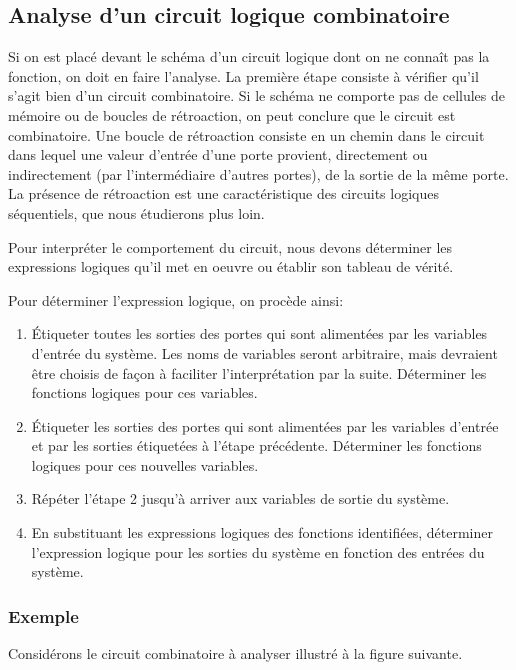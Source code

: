 \documentclass[11pt]{article}
\begin{document}
\subsection{Analyse d'un circuit logique combinatoire}
\label{sec:orgd95d4b9}

Si on est placé devant le schéma d'un circuit logique dont on ne
connaît pas la fonction, on doit en faire l'analyse. La première étape
consiste à vérifier qu'il s'agit bien d'un circuit combinatoire. Si le
schéma ne comporte pas de cellules de mémoire ou de boucles de
rétroaction, on peut conclure que le circuit est combinatoire. Une
boucle de rétroaction consiste en un chemin dans le circuit dans
lequel une valeur d'entrée d'une porte provient, directement ou
indirectement (par l'intermédiaire d'autres portes), de la sortie de
la même porte. La présence de rétroaction est une caractéristique des
circuits logiques séquentiels, que nous étudierons plus loin.

Pour interpréter le comportement du circuit, nous devons déterminer
les expressions logiques qu'il met en oeuvre ou établir son tableau de
vérité.

Pour déterminer l'expression logique, on procède ainsi:
\begin{enumerate}
\item Étiqueter toutes les sorties des portes qui sont alimentées par les
variables d'entrée du système. Les noms de variables seront
arbitraire, mais devraient être choisis de façon à faciliter
l'interprétation par la suite. Déterminer les fonctions logiques
pour ces variables.
\item Étiqueter les sorties des portes qui sont alimentées par les
variables d'entrée et par les sorties étiquetées à l'étape
précédente. Déterminer les fonctions logiques pour ces nouvelles
variables.
\item Répéter l'étape 2 jusqu'à arriver aux variables de sortie du système.
\item En substituant les expressions logiques des fonctions identifiées,
déterminer l'expression logique pour les sorties du système en
fonction des entrées du système.
\end{enumerate}

\subsubsection{Exemple}
\label{sec:orgdaa9003}

Considérons le circuit combinatoire à analyser illustré à la figure
suivante.
\end{document}
